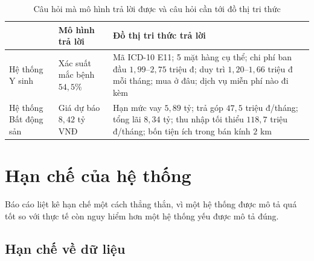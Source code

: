 \begin{table}[H]
\centering
\caption{Câu hỏi mà mô hình trả lời được và câu hỏi cần tới đồ thị tri thức}
\label{tab:vaitro-kg}
\small
\begin{tabularx}{\textwidth}{@{}L{4.0cm}XX@{}}
\toprule
 & \textbf{Mô hình trả lời} & \textbf{Đồ thị tri thức trả lời} \\
\midrule
Hệ thống Y sinh &
Xác suất mắc bệnh $54{,}5\%$ &
Mã ICD-10 E11; 5 mặt hàng cụ thể; chi phí ban đầu $1{,}99$--$2{,}75$ triệu đ;
duy trì $1{,}20$--$1{,}66$ triệu đ mỗi tháng; mua ở đâu; dịch vụ miễn phí nào đi
kèm \\
\addlinespace
Hệ thống Bất động sản &
Giá dự báo $8{,}42$ tỷ VNĐ &
Hạn mức vay $5{,}89$ tỷ; trả góp $47{,}5$ triệu đ/tháng; tổng lãi $8{,}34$ tỷ;
thu nhập tối thiểu $118{,}7$ triệu đ/tháng; bốn tiện ích trong bán kính $2$ km \\
\bottomrule
\end{tabularx}
\end{table}


\section{Hạn chế của hệ thống}
\label{sec:hanche}

Báo cáo liệt kê hạn chế một cách thẳng thắn, vì một hệ thống được mô tả quá tốt
so với thực tế còn nguy hiểm hơn một hệ thống yếu được mô tả đúng.

\subsection{Hạn chế về dữ liệu}

